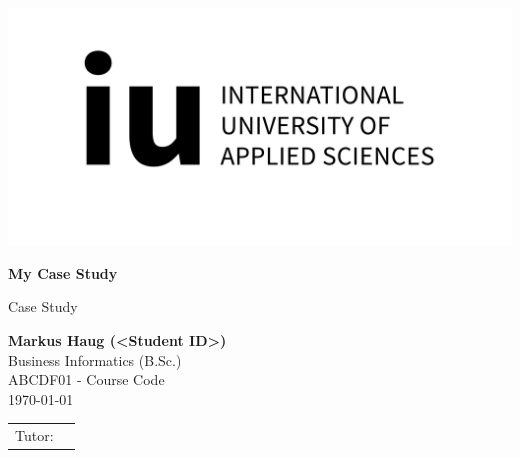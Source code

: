 \def\usesf{}
\let\usesf\sffamily %

\newsavebox{\Tutor}


\setlength{\unitlength}{1pt}

\begin{titlepage}
\vspace{-39pt}\hspace*{300pt}\includegraphics[width=.21\paperwidth]{logos/iu_Logo_EN.jpg}

\begin{center}
\hbox{}
\vfill
{\usesf}
{\huge\bfseries My Case Study \par}
\vskip 1.8cm
Case Study\\[2mm]
\vskip 1cm

{\large\bfseries Markus Haug (<Student ID>)\\}
\vskip 1.2cm
Business Informatics (B.Sc.)\\
ABCDF01 - Course Code\\
\today %
\vskip 3cm
\begin{tabular}{p{3cm}l}
Tutor: & \usebox{\Tutor} \\
\end{tabular}
\vfill
\end{center}

\end{titlepage}


